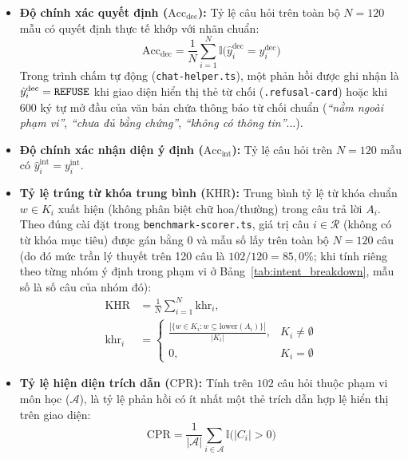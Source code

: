 \documentclass{IEEEtran}
\begin{document}
\begin{itemize}
    \item \textbf{Độ chính xác quyết định ($\text{Acc}_{\text{dec}}$):} Tỷ lệ câu hỏi trên toàn bộ $N = 120$ mẫu có quyết định thực tế khớp với nhãn chuẩn:
    \begin{equation}
    \text{Acc}_{\text{dec}} = \frac{1}{N}\sum_{i=1}^{N} \mathbb{I}\bigl(\hat{y}_i^{\text{dec}} = y_i^{\text{dec}}\bigr)
    \end{equation}
    Trong trình chấm tự động (\texttt{chat-helper.ts}), một phản hồi được ghi nhận là $\hat{y}_i^{\text{dec}} = \text{\texttt{REFUSE}}$ khi giao diện hiển thị thẻ từ chối (\texttt{.refusal-card}) hoặc khi 600 ký tự mở đầu của văn bản chứa thông báo từ chối chuẩn (\textit{``nằm ngoài phạm vi''}, \textit{``chưa đủ bằng chứng''}, \textit{``không có thông tin''}...).
    \item \textbf{Độ chính xác nhận diện ý định ($\text{Acc}_{\text{int}}$):} Tỷ lệ câu hỏi trên $N = 120$ mẫu có $\hat{y}_i^{\text{int}} = y_i^{\text{int}}$.
    \item \textbf{Tỷ lệ trúng từ khóa trung bình ($\text{KHR}$):} Trung bình tỷ lệ từ khóa chuẩn $w \in K_i$ xuất hiện (không phân biệt chữ hoa/thường) trong câu trả lời $A_i$. Theo đúng cài đặt trong \texttt{benchmark-scorer.ts}, giá trị câu $i \in \mathcal{R}$ (không có từ khóa mục tiêu) được gán bằng $0$ và mẫu số lấy trên toàn bộ $N = 120$ câu (do đó mức trần lý thuyết trên 120 câu là $102/120 = 85{,}0\%$; khi tính riêng theo từng nhóm ý định trong phạm vi ở Bảng~\ref{tab:intent_breakdown}, mẫu số là số câu của nhóm đó):
    \begin{equation}
    \begin{aligned}
    \text{KHR} &= \frac{1}{N}\sum_{i=1}^{N} \text{khr}_i, \\[2pt]
    \text{khr}_i &= \begin{cases} \frac{|\{w \in K_i : w \subseteq \text{lower}(A_i)\}|}{|K_i|}, & K_i \ne \emptyset \\ 0, & K_i = \emptyset \end{cases}
    \end{aligned}
    \end{equation}
    \item \textbf{Tỷ lệ hiện diện trích dẫn ($\text{CPR}$):} Tính trên $102$ câu hỏi thuộc phạm vi môn học ($\mathcal{A}$), là tỷ lệ phản hồi có ít nhất một thẻ trích dẫn hợp lệ hiển thị trên giao diện:
    \begin{equation}
    \text{CPR} = \frac{1}{|\mathcal{A}|}\sum_{i \in \mathcal{A}} \mathbb{I}\bigl(|C_i| > 0\bigr)

\end{equation}
\end{itemize}
\end{document}
